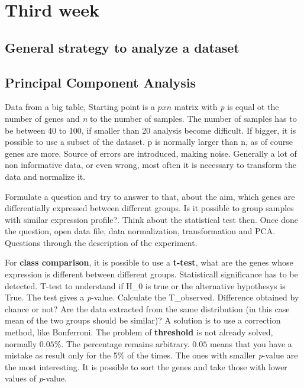 \graphicspath{{chapters/images/03/}}

\chapter{Third week}

\section{General strategy to analyze a dataset}

\section{Principal Component Analysis}
Data from a big table, Starting point is a $ p x n $ matrix with \textit{p} is equal ot the number of genes and \textit{n} to the number of samples. The number of samples has to be between 40 to 100, if smaller than 20 analysis become difficult. If bigger, it is possible to use a subset of the dataset. p is normally larger than n, as of course genes are more. Source of errors are introduced, making noise. Generally a lot of non informative data, or even wrong, most often it is necessary to transform the data and normalize it. 

Formulate a question and try to answer to that, about the aim, which genes are differentially expressed between different groups. Is it possible to group samples with similar expression profile?. Think about the statistical test then. Once done the question, open data file, data normalization, transformation and PCA. Questions through the description of the experiment. 

For \textbf{class comparison}, it is possible to use a \textbf{t-test}, what are the genes whose expression is different between different groups. Statisticall significance has to be detected. T-test to understand if H_0 is true or the alternative hypothesys is True. The test gives a \textit{p}-value.
Calculate the T_{observed}. Difference obtained by chance or not? Are the data extracted from the same distribution (in this case mean of the two groups should be similar)? 
A solution is to use a correction method, like Bonferroni. The problem of \textbf{threshold} is not already solved, normally $0.05\%$. The percentage remains arbitrary. $0.05$ means that you have a mistake as result only for the 5\% of the times. 
The ones with smaller \textit{p}-value are the most interesting. It is possible to sort the genes and take those with lower values of \textit{p}-value.

